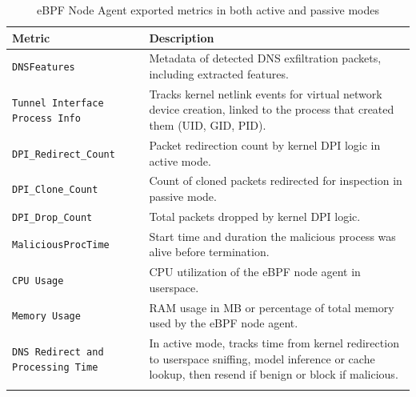 \documentclass [11pt, proquest] {uwthesis}[2020/02/24]
\begin{document}
\begin{longtable}{|p{4cm}|p{10cm}|}
\hline
\textbf{Metric} & \textbf{Description} \\
\hline
\texttt{DNSFeatures} & Metadata of detected DNS exfiltration packets, including extracted features. \\
\hline
\texttt{Tunnel Interface Process Info} & Tracks kernel netlink events for virtual network device creation, linked to the process that created them (UID, GID, PID). \\
\hline
\texttt{DPI\_Redirect\_Count} & Packet redirection count by kernel DPI logic in active mode. \\
\hline
\texttt{DPI\_Clone\_Count} & Count of cloned packets redirected for inspection in passive mode. \\
\hline
\texttt{DPI\_Drop\_Count} & Total packets dropped by kernel DPI logic. \\
\hline
\texttt{MaliciousProcTime} & Start time and duration the malicious process was alive before termination. \\
\hline
\texttt{CPU Usage} & CPU utilization of the eBPF node agent in userspace. \\
\hline
\texttt{Memory Usage} & RAM usage in MB or percentage of total memory used by the eBPF node agent. \\
\hline
\texttt{DNS Redirect and Processing Time} & In active mode, tracks time from kernel redirection to userspace sniffing, model inference or cache lookup, then resend if benign or block if malicious. \\
\hline
\caption{eBPF Node Agent exported metrics in both active and passive modes}
\label{sec:dp_ebpf_node_metrics}
\end{longtable}








\end{document}
